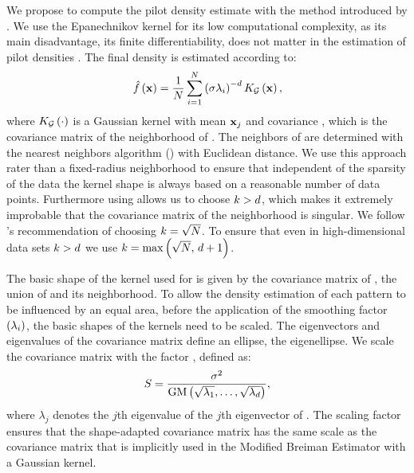 We propose to compute the pilot density estimate with the method introduced by \citeauthor{wilkinson1995dataplot}. We use the Epanechnikov kernel for its low computational complexity, as its main disadvantage, its finite differentiability, does not matter in the estimation of pilot densities \cite{silverman1986density}. 
The final density is estimated according to:
\begin{equation}
	\varEstimatedDensityFunction{\varPattern} = \frac{1}{\varNumPatterns} \sum_{i = 1}^{\varNumPatterns} \left(\varBandwidth\varLocalBandwidth{i}\right)^{-\varDim} \varKernel[\varGaussian]{\varPattern},
\end{equation}
where $\varKernel[\varGaussian]{\cdot}$ is a Gaussian kernel with mean $\varPattern[j]$ and covariance \varCovarianceMatrix, 
which is the covariance matrix of the neighborhood of \varPattern. The neighbors of \varPattern are determined with the \KNNK nearest neighbors algorithm (\KNN) with Euclidean distance. We use this approach rater than a fixed-radius neighborhood to ensure that independent of the sparsity of the data the kernel shape is always based on a reasonable number of data points. Furthermore using \KNN allows us to choose $k > d$, which makes it extremely improbable that the covariance matrix of the neighborhood is singular. We follow \citeauthor{silverman1986density}'s \cite{silverman1986density} recommendation of choosing $k = \sqrt{N}$. To ensure that even in high-dimensional data sets $k > d$ we use $k = \max\left(\sqrt{N},\, d + 1\right)$.

The basic shape of the kernel used for \varPattern is given by the covariance matrix of \varNeighborhood{\varPattern}, \ie the union of \varPattern and its neighborhood.
To allow the density estimation of each pattern to be influenced by an equal area, before the application of the smoothing factor $(\lambda_{i})$, the basic shapes of the kernels need to be scaled. The eigenvectors and eigenvalues of the covariance matrix define an ellipse, the eigenellipse. We scale the covariance matrix with the factor \varScalingFactor, defined as:
\begin{equation}
	S = \frac{\sigma^2}{\text{GM}\left(\sqrt{\lambda_1}, \dotsc, \sqrt{\lambda_d}\right)},
\end{equation}
where $\lambda_j$ denotes the $j$th eigenvalue of the $j$th eigenvector of \varCovarianceMatrix. The scaling factor \varScalingFactor ensures that the shape-adapted covariance matrix has the same scale as the covariance matrix that is implicitly used in the Modified Breiman Estimator with a Gaussian kernel.

